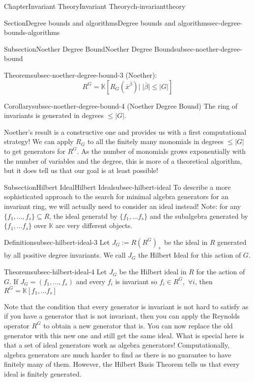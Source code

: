 \documentclass[oneside,10pt,]{book}
\begin{document}
\begin{chapterptx}{Chapter}{Invariant Theory}{}{Invariant Theory}{}{}{ch-invarianttheory}
\begin{sectionptx}{Section}{Degree bounds and algorithms}{}{Degree bounds and algorithms}{}{}{sec-degree-bounds-algorithms}
\begin{subsectionptx}{Subsection}{Noether Degree Bound}{}{Noether Degree Bound}{}{}{subsec-noether-degree-bound}
\begin{theorem}{Theorem}{}{}{subsec-noether-degree-bound-3}
(Noether):%
\begin{equation*}
R^G = \mathbb{K} [ R_G(\bar x^{\bar \beta}) | \; |\bar \beta| \leq |G|]
\end{equation*}
%
\end{theorem}
\begin{corollary}{Corollary}{}{}{subsec-noether-degree-bound-4}%
(Noether Degree Bound) The ring of invariants is generated in degrees \(\leq |G|\).%
\end{corollary}
Noether's result is a constructive one and provides us with a first computational strategy! We can apply \(R_G\) to all the finitely many monomials in degrees \(\leq |G|\) to get generators for \(R^G\). As the number of monomials grows exponentially with the number of variables and the degree, this is more of a theoretical algorithm, but it does tell us that our goal is at least possible!%
\end{subsectionptx}
%
%
\typeout{************************************************}
\typeout{************************************************}
%
\begin{subsectionptx}{Subsection}{Hilbert Ideal}{}{Hilbert Ideal}{}{}{subsec-hilbert-ideal}
To describe a more sophisticated approach to the search for minimal algebra generators for an invariant ring, we will actually need to consider an ideal instead! Note: for  any \(\{ f_1,..., f_s\} \subseteq R\), the ideal generatd by \(\{f_1,...f_s\}\) and the subalgebra generated by  \(\{f_1,...f_s\}\) over \(\mathbb{K}\) are very different objects.%
\begin{definition}{Definition}{}{subsec-hilbert-ideal-3}%
Let \(J_G := R(R^G)_+\) be the ideal in \(R\) generated by all positive degree invariants. We call \(J_G\) the Hilbert Ideal for this action of \(G\).%
\end{definition}
\begin{theorem}{Theorem}{}{}{subsec-hilbert-ideal-4}%
Let \(J_G \) be the Hilbert ideal in \(R\) for the action of \(G\). If \(J_G = (f_1,...,f_s)\) and every \(f_i\) is invariant so \(f_i\in R^G, \,\, \forall i\), then \(R^G = \mathbb{K}[f_1,...f_s]\)%
\end{theorem}
Note that the condition that every generator is invariant is not hard to satisfy as if you have a generator that is not invariant, then you can apply the Reynolds operator \(R^G\) to obtain a new generator that is. You can now replace the old generator with this new one and still get the same ideal. What is special here is that a set of ideal generators work as algebra generators! Computationally, algebra generators are much harder to find as there is no guarantee to have finitely many of them. However, the Hilbert Basis Theorem tells us that every ideal is finitely generated.%

\end{subsectionptx}
\end{sectionptx}
\end{chapterptx}
\end{document}
